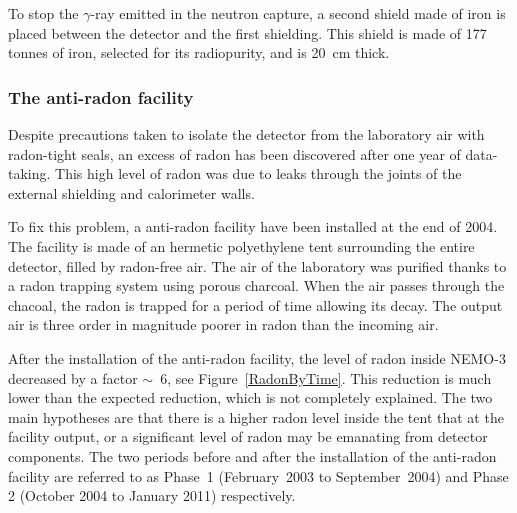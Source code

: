 \documentclass[main.tex]{subfiles}
\begin{document}
\bigskip

\NI To stop the $\gamma$-ray emitted in the neutron capture, a second shield made of iron is placed between the detector and the first shielding. This shield is made of 177 tonnes of iron, selected for its radiopurity, and is 20~cm thick.


\subsubsection{The anti-radon facility}


\NI Despite precautions taken to isolate the detector from the laboratory air with radon-tight seals, an excess of radon has been discovered after one year of data-taking. This high level of radon was due to leaks through the joints of the external shielding and calorimeter walls.


\bigskip


\NI To fix this problem, a anti-radon facility have been installed at the end of 2004. The facility is made of an hermetic polyethylene tent surrounding the entire detector, filled by radon-free air. The air of the laboratory was purified thanks to a radon trapping system using porous charcoal. When the air passes through the chacoal, the radon is trapped for a period of time allowing its decay. The output air is three order in magnitude poorer in radon than the incoming air.


\bigskip


\NI After the installation of the anti-radon facility, the level of radon inside NEMO-3 decreased by a factor $\sim$~6, see Figure~\ref{RadonByTime}. This reduction is much lower than the expected reduction, which is not completely explained. The two main hypotheses are that there is a higher radon level inside the tent that at the facility output, or a significant level of radon may be emanating from detector components. The two periods before and after the installation of the anti-radon facility are referred to as Phase~1 (February~2003 to September~2004) and Phase 2 (October 2004 to January 2011) respectively.
\end{document}
